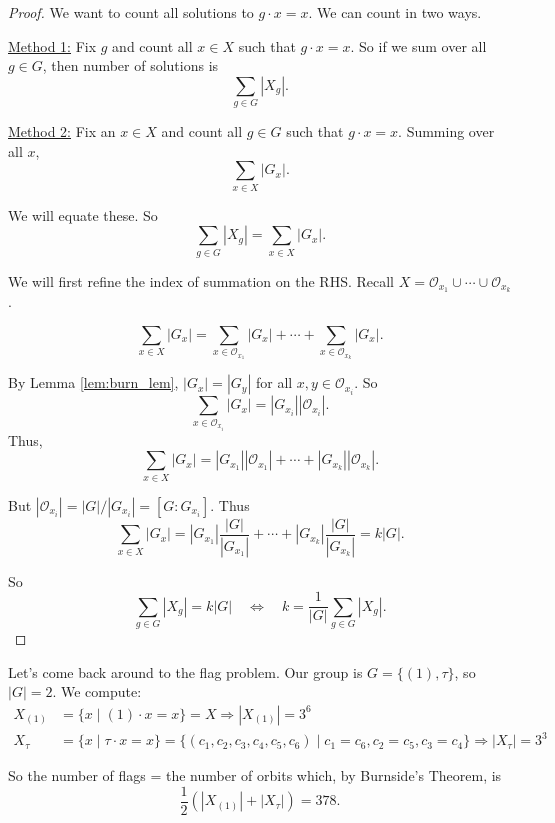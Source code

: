 \begin{proof}
	We want to count all solutions to $g\cdot x=x$. We can count in two ways.

	\underline{Method 1:} Fix $g$ and count all $x\in X$ such that
	$g\cdot x=x$. So if we sum over all $g\in G$, then number of solutions is
	$$\sum_{g\in G}|X_g|.$$

	\underline{Method 2:} Fix an $x\in X$ and count all $g\in G$ such that $g\cdot x=x$. Summing over all $x$,
	$$\sum_{x\in X}|G_x|.$$

	We will equate these. So
	$$\sum_{g\in G}|X_g|=\sum_{x\in X}|G_x|.$$

	We will first refine the index of summation on the RHS. Recall $X=\mathcal O_{x_1}\cup\cdots\cup\mathcal O_{x_k}$.

	$$\sum_{x\in X}|G_x|=\sum_{x\in\mathcal O_{x_1}}|G_x|+\cdots+\sum_{x\in\mathcal O_{x_k}}|G_x|.$$

	By Lemma \ref{lem:burn_lem}, $|G_x|=|G_y|$ for all $x,y\in\mathcal O_{x_i}$. So
	$$\sum_{x\in\mathcal O_{x_i}}|G_x|=|G_{x_i}||\mathcal O_{x_i}|.$$
	Thus,
	$$\sum_{x\in X}|G_x|=|G_{x_1}||\mathcal O_{x_1}|+\cdots +|G_{x_k}||\mathcal O_{x_k}|.$$

	But $|\mathcal O_{x_i}|=|G|/|G_{x_i}|=[G:G_{x_i}]$. Thus
	$$\sum_{x\in X}|G_x|=|G_{x_1}|\frac{|G|}{|G_{x_1}|}+\cdots +|G_{x_k}|\frac{|G|}{|G_{x_k}|}=k|G|.$$

	So
	$$\sum_{g\in G}|X_g|=k|G|\quad\Leftrightarrow\quad k=\frac{1}{|G|}\sum_{g\in G}|X_g|.$$
\end{proof}

Let's come back around to the flag problem. Our group is $G=\{(1),\tau\}$, so $|G|=2$. We compute:
\begin{align*}
	X_{(1)}&=\{x\mid (1)\cdot x=x\}=X\Rightarrow |X_{(1)}|=3^6\\
	X_\tau&=\{x\mid \tau\cdot x=x\}=\{(c_1,c_2,c_3,c_4,c_5,c_6)\mid c_1=c_6,c_2=c_5,c_3=c_4\}\Rightarrow |X_{\tau}|=3^3
\end{align*}

So the number of flags = the number of orbits which, by Burnside's Theorem, is
$$\frac 12(|X_{(1)}|+|X_\tau|)=378.$$